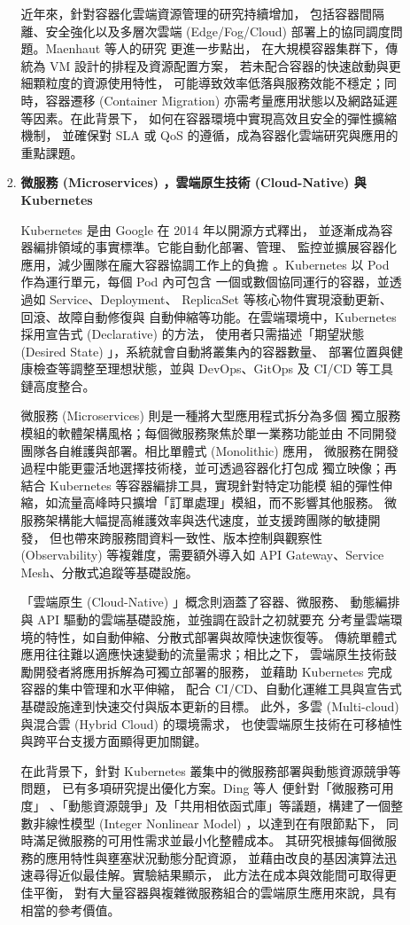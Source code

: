 \documentclass[12pt,a4paper]{article}
\begin{document}
\begin{enumerate}[label={(\zhdig*)}, leftmargin=2\parindent, listparindent=\parindent]
\begin{enumerate}[label={(\arabic*)}, leftmargin=\parindent, listparindent=\parindent]
\begin{enumerate}[label={(\zhdig*)}, leftmargin=\parindent, listparindent=\parindent]
近年來，針對容器化雲端資源管理的研究持續增加，
包括容器間隔離、安全強化以及多層次雲端 (Edge/Fog/Cloud)
部署上的協同調度問題。Maenhaut 等人的研究\cite{20} 更進一步點出，
在大規模容器集群下，傳統為 VM 設計的排程及資源配置方案，
若未配合容器的快速啟動與更細顆粒度的資源使用特性，
可能導致效率低落與服務效能不穩定；同時，容器遷移 (Container Migration)
亦需考量應用狀態以及網路延遲等因素。在此背景下，
如何在容器環境中實現高效且安全的彈性擴縮機制，
並確保對 SLA 或 QoS 的遵循，成為容器化雲端研究與應用的重點課題。

\item\textbf{
微服務 (Microservices) \cite{10}，雲端原生技術 (Cloud-Native) 與 Kubernetes
}

Kubernetes 是由 Google 在 2014 年以開源方式釋出，
並逐漸成為容器編排領域的事實標準。它能自動化部署、管理、
監控並擴展容器化應用，減少團隊在龐大容器協調工作上的負擔
。Kubernetes 以 Pod 作為運行單元，每個 Pod 內可包含
一個或數個協同運行的容器，並透過如 Service、Deployment、
ReplicaSet 等核心物件實現滾動更新、回滾、故障自動修復與
自動伸縮等功能。在雲端環境中，Kubernetes 採用宣告式 (Declarative) 的方法，
使用者只需描述「期望狀態 (Desired State) 」，系統就會自動將叢集內的容器數量、
部署位置與健康檢查等調整至理想狀態，並與 DevOps、GitOps 及 CI/CD 等工具鏈高度整合。

微服務 (Microservices) 則是一種將大型應用程式拆分為多個
獨立服務模組的軟體架構風格；每個微服務聚焦於單一業務功能並由
不同開發團隊各自維護與部署。相比單體式 (Monolithic) 應用，
微服務在開發過程中能更靈活地選擇技術棧，並可透過容器化打包成
獨立映像；再結合 Kubernetes 等容器編排工具，實現針對特定功能模
組的彈性伸縮，如流量高峰時只擴增「訂單處理」模組，而不影響其他服務。
微服務架構能大幅提高維護效率與迭代速度，並支援跨團隊的敏捷開發，
但也帶來跨服務間資料一致性、版本控制與觀察性 (Observability)
等複雜度，需要額外導入如 API Gateway、Service Mesh、分散式追蹤等基礎設施。

「雲端原生 (Cloud-Native) 」概念則涵蓋了容器、微服務、
動態編排與 API 驅動的雲端基礎設施，並強調在設計之初就要充
分考量雲端環境的特性，如自動伸縮、分散式部署與故障快速恢復等。
傳統單體式應用往往難以適應快速變動的流量需求；相比之下，
雲端原生技術鼓勵開發者將應用拆解為可獨立部署的服務，
並藉助 Kubernetes 完成容器的集中管理和水平伸縮，
配合 CI/CD、自動化運維工具與宣告式基礎設施達到快速交付與版本更新的目標。
此外，多雲 (Multi-cloud) 與混合雲 (Hybrid Cloud) 的環境需求，
也使雲端原生技術在可移植性與跨平台支援方面顯得更加關鍵。

在此背景下，針對 Kubernetes 叢集中的微服務部署與動態資源競爭等問題，
已有多項研究提出優化方案。Ding 等人\cite{21} 便針對「微服務可用度」
、「動態資源競爭」及「共用相依函式庫」等議題，構建了一個整數非線性模型
(Integer Nonlinear Model) ，以達到在有限節點下，
同時滿足微服務的可用性需求並最小化整體成本。
其研究根據每個微服務的應用特性與壅塞狀況動態分配資源，
並藉由改良的基因演算法迅速尋得近似最佳解。實驗結果顯示，
此方法在成本與效能間可取得更佳平衡，
對有大量容器與複雜微服務組合的雲端原生應用來說，具有相當的參考價值。


\end{enumerate}
\end{enumerate}
\end{enumerate}
\end{document}
